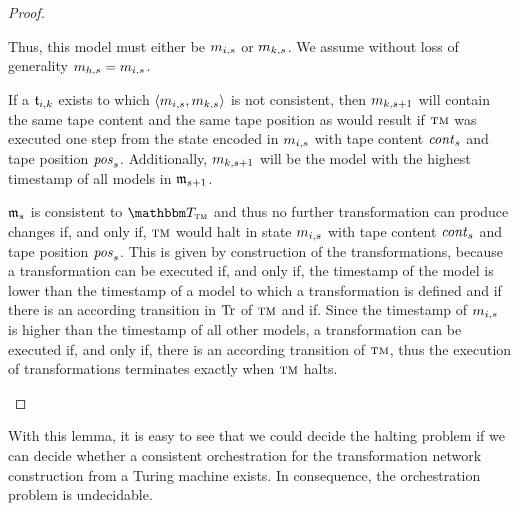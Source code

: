 \begin{proof}
\begin{longenumerate}
            Thus, this model must either be $m_{i,s}$ or $m_{k,s}$.
            We assume without loss of generality $m_{h,s} = m_{i,s}$.            
		 \item
            If a $\mathfrak{t}_{i,k}$ exists to which $\langle m_{i,s},m_{k,s} \rangle$ is not consistent, then $m_{k,s+1}$ %
            will contain the same tape content and the same tape position as would result if $\textsc{tm}$ was executed one step from the state encoded in $m_{i,s}$ with tape content $\mathit{cont}_s$ and tape position $\mathit{pos}_s$.
		 	Additionally, $m_{k,s+1}$ will be the model with the highest timestamp of all models in $\mathfrak{m}_{s+1}$.
		 \item 
             $\mathfrak{m}_{s}$ is consistent to $\transformationset{T}_{\TuringMachine}$ and thus no further transformation can produce changes if, and only if, $\textsc{tm}$ would halt in state $m_{i,s}$ with tape content $\mathit{cont}_s$ and tape position $\mathit{pos}_s$.
             This is given by construction of the transformations, because a transformation can be executed if, and only if, the timestamp of the model is lower than the timestamp of a model to which a transformation is defined and if there is an according transition in $\operatorname{Tr}$ of $\textsc{tm}$ and if.
             Since the timestamp of $m_{i,s}$ is higher than the timestamp of all other models, a transformation can be executed if, and only if, there is an according transition of $\textsc{tm}$, thus the execution of transformations terminates exactly when $\textsc{tm}$ halts.
		 	\qedhere
	\end{longenumerate}
\end{proof}

With this lemma, it is easy to see that we could decide the halting problem if we can decide whether a consistent orchestration for the transformation network construction from a Turing machine exists.
In consequence, the orchestration problem is undecidable.

